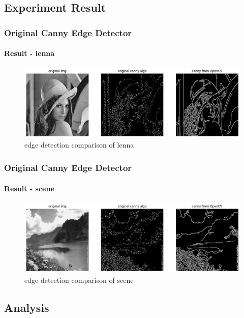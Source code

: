 \documentclass[
	11pt, %
	aspectratio=169, %
]{beamer}
\begin{document}
\subsection{Experiment Result}

\begin{frame}
	\frametitle{Original Canny Edge Detector}
	\framesubtitle{Result - lenna}

	\begin{figure}
		\includegraphics[width=0.8\linewidth]{lenna_edge_compare.png}
		\caption{edge detection comparison of lenna}
	\end{figure}

\end{frame}

\begin{frame}
	\frametitle{Original Canny Edge Detector}
	\framesubtitle{Result - scene}

	\begin{figure}
		\includegraphics[width=0.8\linewidth]{scene_edge_compare.png}
		\caption{edge detection comparison of scene}
	\end{figure}

\end{frame}

\subsection{Analysis}
\end{document}
